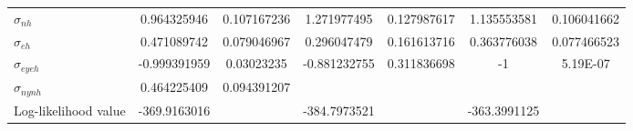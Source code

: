 \documentclass[fleqn]{article}
\begin{document}
\begin{outline}[enumerate]
\begin{landscape}
\begin{table}[]
\begin{tabular}{@{}lSSSSSS@{}}
					$\sigma_{nh}$               & 0.964325946  & 0.107167236 & 1.271977495         & 0.127987617        & 1.135553581         & 0.106041662       \\
					$\sigma_{eh}$               & 0.471089742  & 0.079046967 & 0.296047479         & 0.161613716        & 0.363776038         & 0.077466523       \\
					$\sigma_{eyeh}$             & -0.999391959 & 0.03023235  & -0.881232755        & 0.311836698        & -1                  & 5.19E-07          \\
					$\sigma_{nynh}$             & 0.464225409  & 0.094391207 &                     &                    &                     &                   \\
					Log-likelihood value        & -369.9163016 &             & -384.7973521        &                    & -363.3991125        &                   \\ \bottomrule
				\end{tabular}
			\end{table}
			
		\end{landscape}
		
		\pagebreak
		
		
		\pagebreak
		
		\begin{landscape}
			

\end{landscape}
\end{outline}
\end{document}
